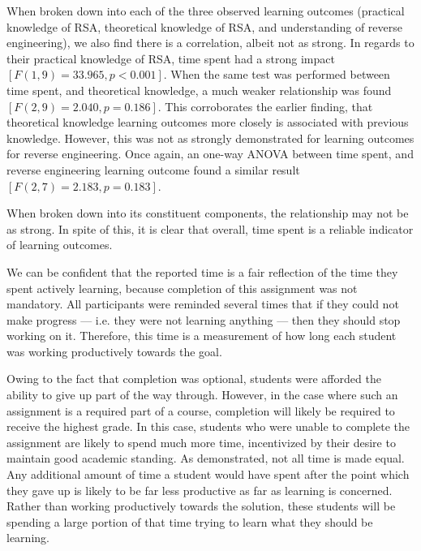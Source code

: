         When broken down into each of the three observed learning outcomes 
        (practical knowledge of RSA, theoretical knowledge of RSA, and understanding of reverse engineering),
        we also find there is a correlation, albeit not as strong. 
        In regards to their practical knowledge of RSA, time spent had a strong impact $[F(1,9)=33.965, p<0.001]$. 
        When the same test was performed between time spent, and theoretical knowledge, a much weaker relationship was found $[F(2, 9)=2.040, p=0.186]$. 
        This corroborates the earlier finding, that theoretical knowledge learning outcomes more closely is associated with previous knowledge. 
        However, this was not as strongly demonstrated for learning outcomes for reverse engineering. 
        Once again, an one-way ANOVA between time spent, and reverse engineering learning outcome found a similar result $[F(2, 7)=2.183, p=0.183]$. 

        When broken down into its constituent components, the relationship may not be as strong.
        In spite of this, it is clear that overall, time spent is a reliable indicator of learning outcomes.

        We can be confident that the reported time is a fair reflection of the time they spent actively learning, because completion of this assignment was not mandatory. 
        All participants were reminded several times that if they could not make progress --- 
        i.e. they were not learning anything --- then they should stop working on it. 
        Therefore, this time is a measurement of how long each student was working productively towards the goal. 

        Owing to the fact that completion was optional, students were afforded the ability to give up part of the way through. 
        However, in the case where such an assignment is a required part of a course, completion will likely be required to receive the highest grade. 
        In this case, students who were unable to complete the assignment are likely to spend much more time, incentivized by their desire to maintain good academic standing. 
        As \citeauthor{Z-Zeng} demonstrated, not all time is made equal. 
        Any additional amount of time a student would have spent after the point which they gave up is likely to be far less productive as far as learning is concerned. 
        Rather than working productively towards the solution, these students will be spending a large portion of that time trying to learn what they should be learning.

